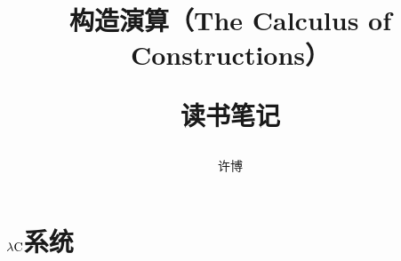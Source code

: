 \documentclass[UTF8]{article}
\title{构造演算（The Calculus of Constructions）\\[2ex]\begin{large}读书笔记\end{large}}
\author{许博}
\date{}
\begin{document}
\maketitle
	\section{$\lambda{\rm C}$系统}
		
\end{document}
